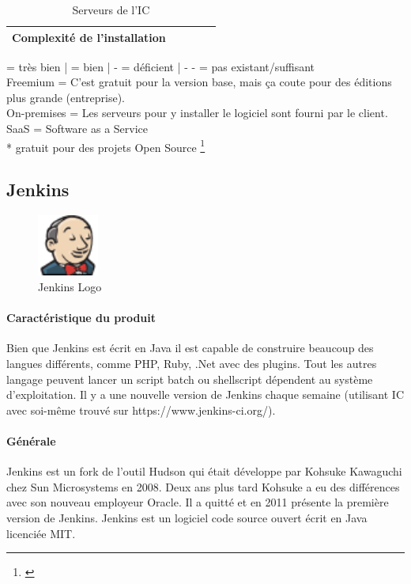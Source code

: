 \begin{landscape}
\begin{table}[H]
\begin{tabular}{lp{4cm}p{4cm}p{4cm}p{4cm}}
			Complexité de l'installation &  & \checkmark & \checkmark\checkmark &  \\
			\bottomrule[0.16em]
		\end{tabular}
	\caption{Serveurs de l'IC}
	\label{tab:serveurs_eval}
\end{table}
\checkmark\checkmark = très bien | \checkmark = bien | - = déficient | - - = pas existant/suffisant \\
Freemium = C'est gratuit pour la version base, mais ça coute pour des éditions plus grande (entreprise).\\
On-premises = Les serveurs pour y installer le logiciel sont fourni par le client.\\
SaaS = Software as a Service \\
* gratuit pour des projets Open Source
\footnote{\citep{jenkinsplugins} \citep{teamcityenv} \citep{tfsversioncontrol}}


\end{landscape}
\newpage

\subsection{Jenkins}
\begin{figure}
  \begin{center}
    \includegraphics[width=0.18\textwidth]{bilder/JENKINS}
  \end{center}
  \caption{Jenkins Logo}
\end{figure}
\paragraph{Caractéristique du produit} Bien que Jenkins est écrit en Java il est capable de construire beaucoup des langues différents, comme PHP, Ruby, .Net avec des plugins. Tout les autres langage peuvent lancer un script batch ou shellscript dépendent au système d'exploitation. Il y a une nouvelle version de Jenkins chaque semaine (utilisant IC avec soi-même trouvé sur https://www.jenkins-ci.org/).

\paragraph{Générale} Jenkins est un fork de l'outil Hudson qui était développe par Kohsuke Kawaguchi chez Sun Microsystems en 2008. Deux ans plus tard Kohsuke a eu des différences avec son nouveau employeur Oracle. Il a quitté et en 2011 présente la première version de Jenkins. Jenkins est un logiciel code source ouvert écrit en Java licenciée MIT. 

